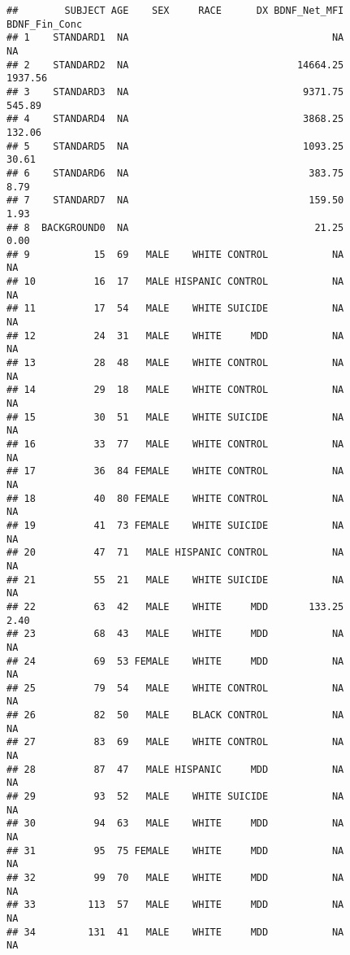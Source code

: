 \documentclass[]{article}
\begin{document}
\begin{verbatim}
##        SUBJECT AGE    SEX     RACE      DX BDNF_Net_MFI BDNF_Fin_Conc
## 1    STANDARD1  NA                                   NA            NA
## 2    STANDARD2  NA                             14664.25       1937.56
## 3    STANDARD3  NA                              9371.75        545.89
## 4    STANDARD4  NA                              3868.25        132.06
## 5    STANDARD5  NA                              1093.25         30.61
## 6    STANDARD6  NA                               383.75          8.79
## 7    STANDARD7  NA                               159.50          1.93
## 8  BACKGROUND0  NA                                21.25          0.00
## 9           15  69   MALE    WHITE CONTROL           NA            NA
## 10          16  17   MALE HISPANIC CONTROL           NA            NA
## 11          17  54   MALE    WHITE SUICIDE           NA            NA
## 12          24  31   MALE    WHITE     MDD           NA            NA
## 13          28  48   MALE    WHITE CONTROL           NA            NA
## 14          29  18   MALE    WHITE CONTROL           NA            NA
## 15          30  51   MALE    WHITE SUICIDE           NA            NA
## 16          33  77   MALE    WHITE CONTROL           NA            NA
## 17          36  84 FEMALE    WHITE CONTROL           NA            NA
## 18          40  80 FEMALE    WHITE CONTROL           NA            NA
## 19          41  73 FEMALE    WHITE SUICIDE           NA            NA
## 20          47  71   MALE HISPANIC CONTROL           NA            NA
## 21          55  21   MALE    WHITE SUICIDE           NA            NA
## 22          63  42   MALE    WHITE     MDD       133.25          2.40
## 23          68  43   MALE    WHITE     MDD           NA            NA
## 24          69  53 FEMALE    WHITE     MDD           NA            NA
## 25          79  54   MALE    WHITE CONTROL           NA            NA
## 26          82  50   MALE    BLACK CONTROL           NA            NA
## 27          83  69   MALE    WHITE CONTROL           NA            NA
## 28          87  47   MALE HISPANIC     MDD           NA            NA
## 29          93  52   MALE    WHITE SUICIDE           NA            NA
## 30          94  63   MALE    WHITE     MDD           NA            NA
## 31          95  75 FEMALE    WHITE     MDD           NA            NA
## 32          99  70   MALE    WHITE     MDD           NA            NA
## 33         113  57   MALE    WHITE     MDD           NA            NA
## 34         131  41   MALE    WHITE     MDD           NA            NA

\end{verbatim}
\end{document}

